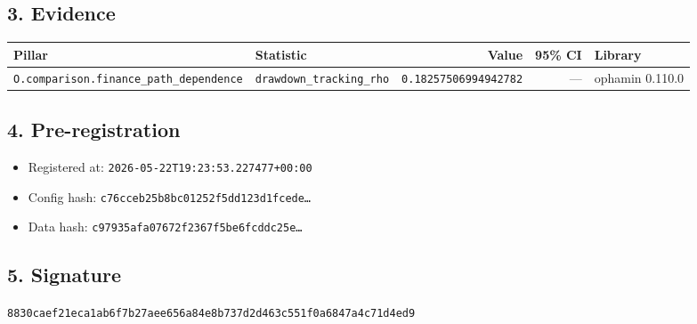 \documentclass{article}
\begin{document}
\subsection*{3. Evidence}
\begin{tabular}{llrrl}\toprule
\textbf{Pillar} & \textbf{Statistic} & \textbf{Value} & \textbf{95\% CI} & \textbf{Library} \\\midrule
\texttt{O.comparison.finance\_path\_dependence} & \texttt{drawdown\_tracking\_rho} & \texttt{0.18257506994942782} & --- & ophamin 0.110.0 \\
\bottomrule\end{tabular}
\subsection*{4. Pre-registration}
\begin{itemize}
\item Registered at: \texttt{2026-05-22T19:23:53.227477+00:00}
\item Config hash: \texttt{c76cceb25b8bc01252f5dd123d1fcede\dots}
\item Data hash: \texttt{c97935afa07672f2367f5be6fcddc25e\dots}
\end{itemize}
\subsection*{5. Signature}
\texttt{8830caef21eca1ab6f7b27aee656a84e8b737d2d463c551f0a6847a4c71d4ed9}\\
\end{document}
